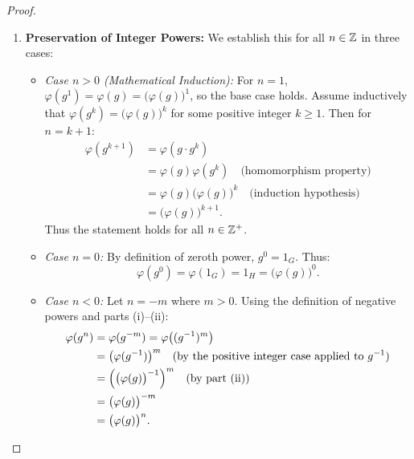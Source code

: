 \begin{proof}
\begin{enumerate}[label=\textbf{(\roman*)}, leftmargin=*, itemsep=8pt]
    \item \textbf{Preservation of Integer Powers:}
    We establish this for all $n \in \mathbb{Z}$ in three cases:
    \begin{itemize}[leftmargin=1.5em, itemsep=4pt]
        \item \emph{Case $n > 0$ (Mathematical Induction):}
        For $n = 1$, $\varphi(g^1) = \varphi(g) = \bigl(\varphi(g)\bigr)^1$, so the base case holds.
        Assume inductively that $\varphi(g^k) = \bigl(\varphi(g)\bigr)^k$ for some positive integer $k \ge 1$.
        Then for $n = k + 1$:
        \begin{align*}
        \varphi(g^{k+1}) &= \varphi(g \cdot g^k) \\
        &= \varphi(g)\varphi(g^k) \quad \text{(homomorphism property)} \\
        &= \varphi(g)\bigl(\varphi(g)\bigr)^k \quad \text{(induction hypothesis)} \\
        &= \bigl(\varphi(g)\bigr)^{k+1}.
        \end{align*}
        Thus the statement holds for all $n \in \mathbb{Z}^+$.
        
        \item \emph{Case $n = 0$:}
        By definition of zeroth power, $g^0 = 1_G$. Thus:
        \begin{equation*}
        \varphi(g^0) = \varphi(1_G) = 1_H = \bigl(\varphi(g)\bigr)^0.
        \end{equation*}
        
        \item \emph{Case $n < 0$:}
        Let $n = -m$ where $m > 0$. Using the definition of negative powers and parts (i)--(ii):
        \begin{align*}
        \varphi(g^n) &= \varphi(g^{-m}) = \varphi\bigl((g^{-1})^m\bigr) \\
        &= \bigl(\varphi(g^{-1})\bigr)^m \quad \text{(by the positive integer case applied to $g^{-1}$)} \\
        &= \Bigl(\bigl(\varphi(g)\bigr)^{-1}\Bigr)^m \quad \text{(by part (ii))} \\
        &= \bigl(\varphi(g)\bigr)^{-m} \\
        &= \bigl(\varphi(g)\bigr)^n.
        \end{align*}
    \end{itemize}


\end{enumerate}
\end{proof}
